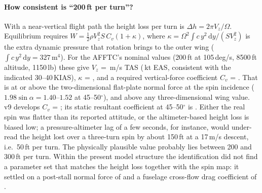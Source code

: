 \documentclass[10pt,a4paper,twocolumn]{article}
\newcommand{\vnine}{v9}
\begin{document}
\paragraph{How consistent is ``200\,ft per turn''?} With a near-vertical flight path the height loss per turn is
$\Delta h = 2\pi V_z/\Omega$. Equilibrium requires $W=\tfrac12\rho V_z^2 S\,C_v(1+\kappa)$, where
$\kappa=\Omega^2\int c\,y^2\,\mathrm dy/(S V_z^2)$ is the extra dynamic pressure that rotation brings to the outer wing
($\int c\,y^2\,\mathrm dy=327$\,m$^4$). For the AFFTC's nominal values (200\,ft at 105\,deg/s, 8500\,ft altitude, 1150\,lb) these
give $V_z$ = \NparaVz\,m/s TAS (\NparaKt\,kt EAS, consistent with the indicated 30--40\,KIAS), $\kappa$ = \NparaKappa, and a required
vertical-force coefficient $C_v$ = \NparaCv. That is at or above the two-dimensional flat-plate normal force at the spin incidence
($1.98\sin\alpha=1.40$--$1.52$ at 45--50$^\circ$), and above any three-dimensional wing value. \vnine{} develops $C_v$ = \NparaCvNine; its static
resultant coefficient at 45--50$^\circ$ is \NparaCrA. Either the real spin was flatter than its reported attitude, or the altimeter-based
height loss is biased low; a pressure-altimeter lag of a few seconds, for instance, would under-read the height lost over a three-turn spin
by about 150\,ft at a 17\,m/s descent, i.e.\ 50\,ft per turn. The physically plausible value probably lies between 200 and 300\,ft per turn.
Within the present model structure the identification did not find a parameter set that matches the height loss together with the spin map:
it settled on a post-stall normal force of \NparCN{} and a fuselage cross-flow drag coefficient of \NparCdc.
\end{document}
